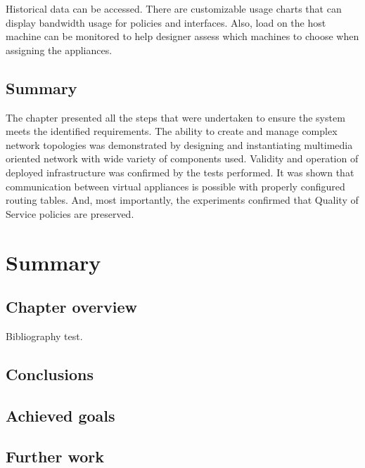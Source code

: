 \documentclass[11pt]{book}
\begin{document}
        Historical data can be accessed. There are customizable usage charts that can display bandwidth usage for
        policies and interfaces. Also, load on the host machine can be monitored to help designer assess which machines
        to choose when assigning the appliances.


    \section*{Summary}

      The chapter presented all the steps that were undertaken to ensure the system meets the identified requirements.
      The ability to create and manage complex network topologies was demonstrated by designing and instantiating
      multimedia oriented network with wide variety of components used. Validity and operation of deployed
      infrastructure was confirmed by the tests performed. It was shown that communication between virtual appliances is
      possible with properly configured routing tables. And, most importantly, the experiments confirmed that Quality of
      Service policies are preserved.


  \chapter{Summary}

    \section*{Chapter overview}

      Bibliography \cite{mittelbach2004} test.
	
		

    \section{Conclusions}
	
		

    \section{Achieved goals}

		

    \section{Further work}
\end{document}
